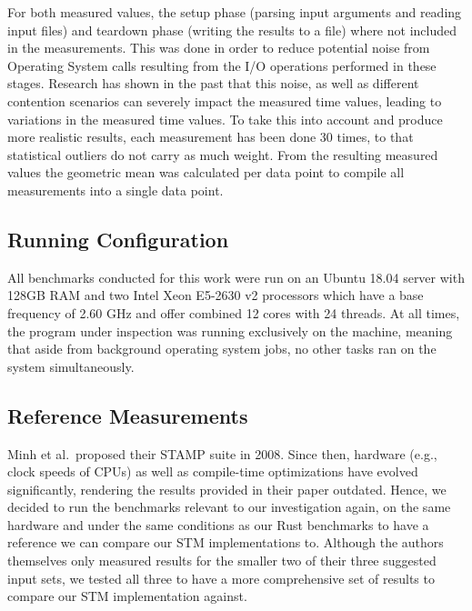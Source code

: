 For both measured values, the setup phase (parsing input arguments and reading input files) and teardown phase (writing the results to a file) where not included in the measurements.
This was done in order to reduce potential noise from Operating System calls resulting from the I/O operations performed in these stages.
Research has shown in the past that this noise, as well as different contention scenarios can severely impact the measured time values, leading to variations in the measured time values.
To take this into account and produce more realistic results, each measurement has been done 30 times, to that statistical outliers do not carry as much weight.
From the resulting measured values the geometric mean was calculated per data point to compile all measurements into a single data point.

\subsection{Running Configuration}
\label{sec:experiments:measurements:hardware}

All benchmarks conducted for this work were run on an Ubuntu 18.04 server with 128GB RAM and two Intel Xeon E5-2630 v2 processors which have a base frequency of 2.60 GHz and offer combined 12 cores with 24 threads.
At all times, the program under inspection was running exclusively on the machine, meaning that aside from background operating system jobs, no other tasks ran on the system simultaneously.

\subsection{Reference Measurements}
\label{sec:experiments:measurements:reference}

Minh et al.\ proposed their STAMP suite in 2008.
Since then, hardware (e.g., clock speeds of CPUs) as well as compile-time optimizations have evolved significantly, rendering the results provided in their paper outdated.
Hence, we decided to run the benchmarks relevant to our investigation again, on the same hardware and under the same conditions as our Rust benchmarks to have a reference we can compare our STM implementations to.
Although the authors themselves only measured results for the smaller two of their three suggested input sets, we tested all three to have a more comprehensive set of results to compare our STM implementation against.


